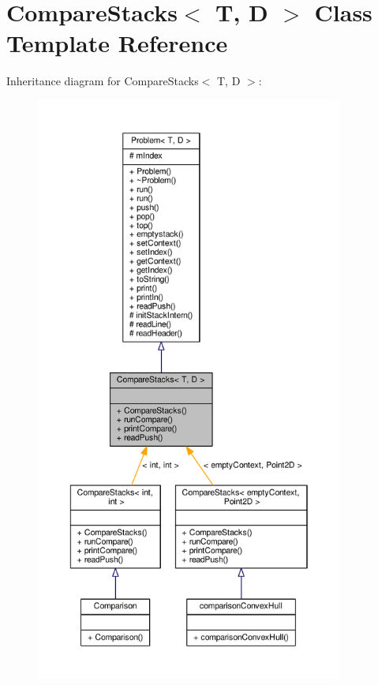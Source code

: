 \hypertarget{class_compare_stacks}{}\section{Compare\+Stacks$<$ T, D $>$ Class Template Reference}
\label{class_compare_stacks}


Inheritance diagram for Compare\+Stacks$<$ T, D $>$\+:
\nopagebreak
\begin{figure}[H]
\begin{center}
\leavevmode
\includegraphics[height=550pt]{class_compare_stacks__inherit__graph}
\end{center}
\end{figure}


